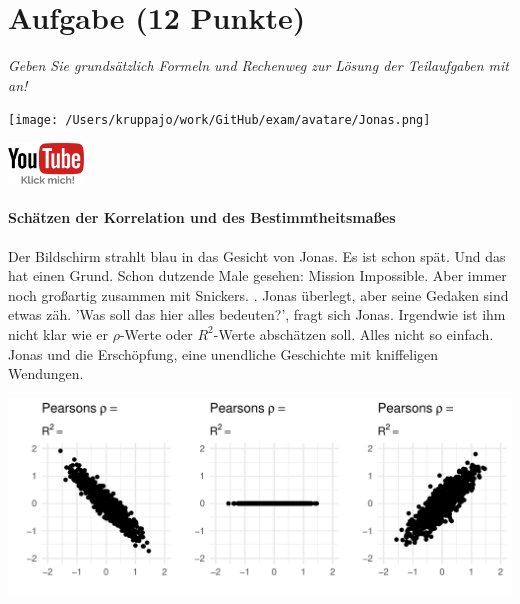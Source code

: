 \documentclass[a4paper, 9pt]{scrartcl}\usepackage[]{graphicx}\usepackage[]{xcolor}
\makeatletter
\def\maxwidth{ %
  \ifdim\Gin@nat@width>\linewidth
    \linewidth
  \else
    \Gin@nat@width
  \fi
}
\makeatother
\begin{document}
\clearpage

\section{Aufgabe \hfill (12 Punkte)}

\textit{Geben Sie grundsätzlich Formeln und Rechenweg zur Lösung der Teilaufgaben mit an!} \\[1Ex]
 

 
\begin{minipage}[t]{0.5\textwidth}
\texttt{[image: /Users/kruppajo/work/GitHub/exam/avatare/Jonas.png]}
\end{minipage}
\begin{minipage}[t]{0.5\textwidth}
\hfill
\href{https://youtu.be/2QJa19ZwLls}{\includegraphics[width = 2cm]{img/youtube}}
\end{minipage}
\vspace{-3ex}



\paragraph{Schätzen der Korrelation und des Bestimmtheitsmaßes}

Der Bildschirm strahlt blau in das Gesicht von Jonas. Es ist schon spät. Und das hat einen Grund. Schon dutzende Male gesehen: Mission Impossible. Aber immer noch großartig zusammen mit Snickers. . Jonas überlegt, aber seine Gedaken sind etwas zäh. 'Was soll das hier alles bedeuten?', fragt sich Jonas. Irgendwie ist ihm nicht klar wie er $\rho$-Werte oder $R^2$-Werte abschätzen soll. Alles nicht so einfach. Jonas und die Erschöpfung, eine unendliche Geschichte mit kniffeligen Wendungen. 
\vspace{2Ex}



{\centering \includegraphics[width=\maxwidth]{img/correlation-02-1} 

}
\end{document}
